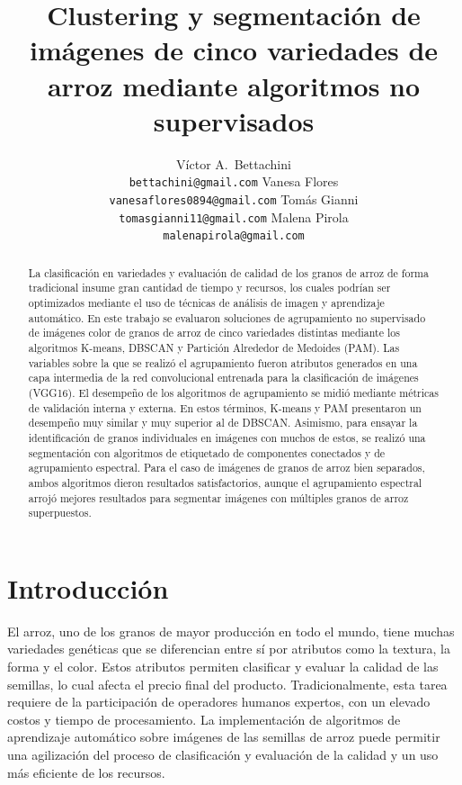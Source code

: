 \documentclass{article}
\title{Clustering y segmentación de imágenes de cinco variedades de arroz mediante algoritmos no supervisados}
\author{
  Víctor A.~Bettachini\\
  \texttt{bettachini@gmail.com}
  \And Vanesa Flores\\
  \texttt{vanesaflores0894@gmail.com}
  \And Tomás Gianni\\
  \texttt{tomasgianni11@gmail.com}
  \And Malena Pirola\\
  \texttt{malenapirola@gmail.com}
}
\begin{document}
\maketitle


\begin{abstract}
La clasificación en variedades y evaluación de calidad de los granos de arroz de forma tradicional insume gran cantidad de tiempo y recursos, los cuales podrían ser optimizados mediante el uso de técnicas de análisis de imagen y aprendizaje automático. En este trabajo se evaluaron soluciones de agrupamiento no supervisado de imágenes color de granos de arroz de cinco variedades distintas mediante los algoritmos K-means, DBSCAN y Partición Alrededor de Medoides (PAM).
Las variables sobre la que se realizó el agrupamiento fueron atributos generados en una capa intermedia de la red convolucional entrenada para la clasificación de imágenes (VGG16). El desempeño de los algoritmos de agrupamiento se midió mediante métricas de validación interna y externa. En estos términos, K-means y PAM presentaron un desempeño muy similar y muy superior al de DBSCAN.
Asimismo, para ensayar la identificación de granos individuales en imágenes con muchos de estos, se realizó una segmentación con algoritmos de etiquetado de componentes conectados y de agrupamiento espectral. Para el caso de imágenes de granos de arroz bien separados, ambos algoritmos dieron resultados satisfactorios, aunque el agrupamiento espectral arrojó mejores resultados para segmentar imágenes con múltiples granos de arroz superpuestos.
\end{abstract}


    
\section{Introducción}
El arroz, uno de los granos de mayor producción en todo el mundo, tiene muchas variedades genéticas que se diferencian entre sí por atributos como la textura, la forma y el color.
Estos atributos permiten clasificar y evaluar la calidad de las semillas, lo cual afecta el precio final del producto.
Tradicionalmente, esta tarea requiere de la participación de operadores humanos expertos, con un elevado costos y tiempo de procesamiento.
La implementación de algoritmos de aprendizaje automático sobre imágenes de las semillas de arroz puede permitir una agilización del proceso de clasificación y evaluación de la calidad y un uso más eficiente de los recursos.
\end{document}
